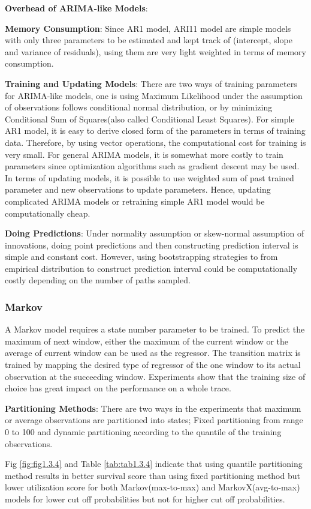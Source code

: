 \documentclass{article}
\begin{document}
\textbf{Overhead of ARIMA-like Models}:
\begin{flushleft}
\textbf{Memory Consumption}: Since AR1 model, ARI11 model are simple models with only three parameters to be estimated and kept track of (intercept, slope and variance of residuals), using them are very light weighted in terms of memory consumption. 

\textbf{Training and Updating Models}: There are two ways of training parameters for ARIMA-like models, one is using Maximum Likelihood under the assumption of observations follows conditional normal distribution, or by minimizing Conditional Sum of Squares(also called Conditional Least Squares). For simple AR1 model, it is easy to derive closed form of the parameters in terms of training data. Therefore, by using vector operations, the computational cost for training is very small. For general ARIMA models, it is somewhat more costly to train parameters since optimization algorithms such as gradient descent may be used. In terms of updating models, it is possible to use weighted sum of past trained parameter and new observations to update parameters. Hence, updating complicated ARIMA models or retraining simple AR1 model would be computationally cheap.

\textbf{Doing Predictions}: Under normality assumption or skew-normal assumption of innovations, doing point predictions and then constructing prediction interval is simple and constant cost. However, using bootstrapping strategies to from empirical distribution to construct prediction interval could be computationally costly depending on the number of paths sampled. 
\end{flushleft}

\subsubsection{Markov}

\begin{flushleft}
A Markov model requires a state number parameter to be trained. To predict the maximum of next window, either the maximum of the current window or the average of current window can be used as the regressor. The transition matrix is trained by mapping the desired type of regressor of the one window to its actual observation at the succeeding window. Experiments show that the training size of choice has great impact on the performance on a whole trace.
\end{flushleft}

\begin{flushleft}
\textbf{Partitioning Methods}: There are two ways in the experiments that maximum or average observations are partitioned into states; Fixed partitioning from range 0 to 100 and dynamic partitioning according to the quantile of the training observations. 

Fig \ref{fig:fig1.3.4} and Table \ref{tab:tab1.3.4} indicate that using quantile partitioning method results in better survival score than using fixed partitioning method but lower utilization score for both Markov(max-to-max) and MarkovX(avg-to-max) models for lower cut off probabilities but not for higher cut off probabilities.
\end{flushleft}
\end{document}
